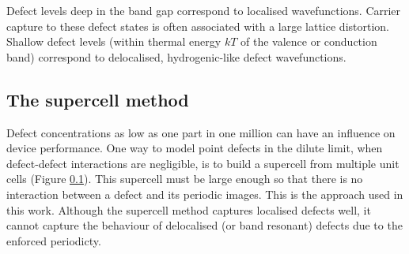 Defect levels deep in the band gap correspond to localised wavefunctions. Carrier capture to these defect states is often associated with a large lattice distortion. Shallow defect levels (within thermal energy $kT$ of the valence or conduction band) correspond to delocalised, hydrogenic-like defect wavefunctions. 





\subsection{The supercell method}

Defect concentrations as low as one part in one million can have an influence on device performance. 
One way to model point defects in the dilute limit, when defect-defect interactions are negligible, is to build a supercell from multiple unit cells (Figure \ref{}).
This supercell must be large enough so that there is no interaction between a defect and its periodic images.
This is the approach used in this work.
Although the supercell method captures localised defects well, it cannot capture the behaviour of delocalised (or band resonant) defects due to the enforced periodicty. 


